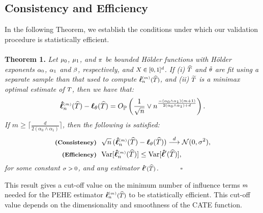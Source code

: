 \documentclass [PhD] {uclathes}
\begin{document}
\subsection{Consistency and Efficiency} 
\label{ch4sec454} 
In the following Theorem, we establish the conditions under which our validation procedure is statistically efficient.\\
\\
{\bf Theorem 1.} {\it Let $\mbox{\footnotesize $\mu_0$}$, $\mbox{\footnotesize $\mu_1$}$, and $\mbox{\footnotesize $\pi$}$ be bounded H\"older functions with H\"older exponents $\mbox{\footnotesize $\alpha_0$}$, $\mbox{\footnotesize $\alpha_1$}$ and $\mbox{\footnotesize $\beta$}$, respectively, and $\mbox{\footnotesize $X \in [0,1]^d$}$. If (i) $\mbox{\footnotesize $\widehat{T}$}$ and $\mbox{\footnotesize $\tilde{\theta}$}$ are fit using a separate sample than that used to compute $\mbox{\footnotesize $\boldsymbol{\hat{\ell}}^{\mbox{\tiny $(m)$}}_{n}(\widehat{T})$}$, and (ii) $\mbox{\footnotesize $\widetilde{T}$}$ is a minimax optimal estimate of $\mbox{\footnotesize $T$}$, then we have that:}
\begin{align}
\boldsymbol{\hat{\ell}}^{\mbox{\tiny $(m)$}}_{n}(\widehat{T})-\boldsymbol{\ell}_{\theta}(\widehat{T}) = O_{\mbox{\footnotesize $\mathbb{P}$}}\left(\frac{1}{\sqrt{n}}\vee n^{\frac{-(\alpha_0 \wedge \alpha_1)(m+1)}{2(\alpha_0 \wedge \alpha_1)+d}}\right).  \nonumber
\end{align}
{\it If \mbox{\footnotesize $m \geq \lceil\frac{d}{2(\alpha_0 \wedge \alpha_1)}\rceil$}, then the following is satisfied:} 
\begin{align}
\mbox{\footnotesize {\bf (Consistency)}}& \,\,\,\, \sqrt{n}\,(\boldsymbol{\hat{\ell}}^{\mbox{\tiny $(m)$}}_{n}(\widehat{T})-\boldsymbol{\ell}_{\theta}(\widehat{T})) \overset{d}{\longrightarrow} \mathcal{N}(0,\sigma^2), \nonumber \\
\mbox{\footnotesize {\bf (Efficiency)}}& \,\,\,\, \mbox{Var}[\boldsymbol{\hat{\ell}}^{\mbox{\tiny $(m)$}}_{n}(\widehat{T})] \leq \mbox{Var}[\boldsymbol{\hat{\ell}}^{\prime}(\widehat{T})], \,\,\,\, \nonumber
\end{align}
{\it for some constant $\mbox{\footnotesize $\sigma > 0$}$, and any estimator $\mbox{\footnotesize $\boldsymbol{\hat{\ell}}^{\prime}(\widehat{T})$}$. \,\,\,\,\,\,\,\,\,\,\,\,\,\, $\boldsymbol{\square}$}

This result gives a cut-off value on the minimum number of influence terms $\mbox{\footnotesize $m$}$ needed for the PEHE estimator $\mbox{\footnotesize $\boldsymbol{\hat{\ell}}^{\mbox{\tiny $(m)$}}_{n}(\widehat{T})$}$ to be statistically efficient. This cut-off value depends on the dimensionality and smoothness of the CATE function. 
\end{document}

